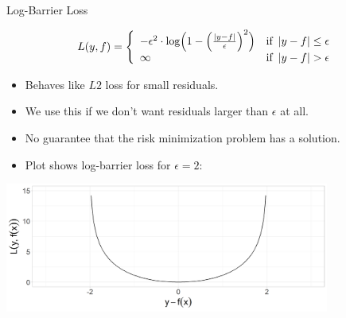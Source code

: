 \documentclass[11pt,compress,t,notes=noshow, xcolor=table]{beamer}
\begin{document}
\begin{vbframe}{Log-Barrier Loss}

\begin{small}
\[
  L(y,f) = \left\{\begin{array}{lr}
        -\epsilon^{2} \cdot \log \Bigl( 1 - \Bigl(\frac{\left|y - f\right|}{\epsilon}\Bigr)^2 \Bigr) & \text{if } \left|y-f\right| \leq \epsilon \\
        \infty & \text{if } \left|y-f\right|  > \epsilon
        \end{array}\right.
  \]
\end{small}

\begin{itemize}
\item Behaves like $L2$ loss for small residuals.
\item We use this if we don't want residuals larger than $\epsilon$ at all.
\item No guarantee that the risk minimization problem has a solution.
\item Plot shows log-barrier loss for $\epsilon=2$:
\end{itemize}

\begin{center}
\includegraphics[width = 0.8\textwidth]{figure/loss_logbarrier_1.png}
\end{center}


\end{vbframe}
\end{document}
